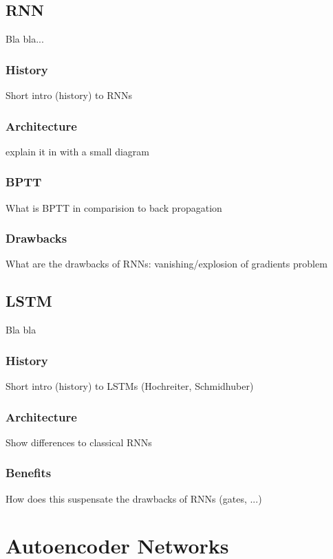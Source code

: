 \subsection{RNN}

Bla bla...

\subsubsection{History}
Short intro (history) to RNNs

\subsubsection{Architecture}
explain it in with a small diagram

\subsubsection{BPTT}
What is BPTT in comparision to back propagation

\subsubsection{Drawbacks}
What are the drawbacks of RNNs: vanishing/explosion of gradients problem

\subsection{LSTM}

Bla bla

\subsubsection{History}
Short intro (history) to LSTMs (Hochreiter, Schmidhuber)

\subsubsection{Architecture}
Show differences to classical RNNs

\subsubsection{Benefits}
How does this suspensate the drawbacks of RNNs (gates, ...)


\section{Autoencoder Networks}

